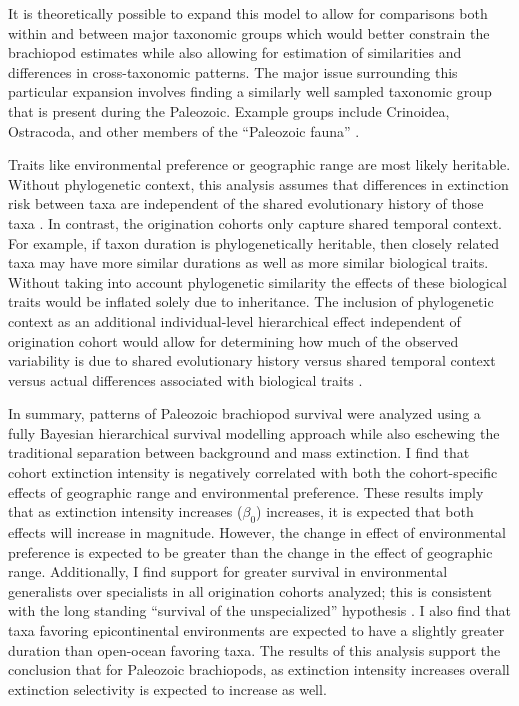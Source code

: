 \documentclass{article}
\begin{document}
It is theoretically possible to expand this model to allow for comparisons both within and between major taxonomic groups which would better constrain the brachiopod estimates while also allowing for estimation of similarities and differences in cross-taxonomic patterns. The major issue surrounding this particular expansion involves finding a similarly well sampled taxonomic group that is present during the Paleozoic. Example groups include Crinoidea, Ostracoda, and other members of the ``Paleozoic fauna'' \citep{Sepkoski1981a}.

Traits like environmental preference or geographic range \citep{Jablonski1987,Hunt2005b} are most likely heritable. Without phylogenetic context, this analysis assumes that differences in extinction risk between taxa are independent of the shared evolutionary history of those  taxa \citep{Felsenstein1985b}. In contrast, the origination cohorts only capture shared temporal context. For example, if taxon duration is phylogenetically heritable, then closely related taxa may have more similar durations as well as more similar biological traits. Without taking into account phylogenetic similarity the effects of these biological traits would be inflated solely due to inheritance. The inclusion of phylogenetic context as an additional individual-level hierarchical effect independent of origination cohort would allow for determining how much of the observed variability is due to shared evolutionary history versus shared temporal context versus actual differences associated with biological traits \citep{Harnik2014,Smits2015}. 

In summary, patterns of Paleozoic brachiopod survival were analyzed using a fully Bayesian hierarchical survival modelling approach while also eschewing the traditional separation between background and mass extinction. I find that cohort extinction intensity is negatively correlated with both the cohort-specific effects of geographic range and environmental preference. These results imply that as extinction intensity increases (\(\beta_{0}\)) increases, it is expected that both effects will increase in magnitude. However, the change in effect of environmental preference is expected to be greater than the change in the effect of geographic range. Additionally, I find support for greater survival in environmental generalists over specialists in all origination cohorts analyzed; this is consistent with the long standing ``survival of the unspecialized'' hypothesis \citep{Liow2004a,Liow2007b,Simpson1944,Simpson1953,Smits2015,Nurnberg2015,Nurnberg2013a, Baumiller1993}. I also find that taxa favoring epicontinental environments are expected to have a slightly greater duration than open-ocean favoring taxa. The results of this analysis support the conclusion that for Paleozoic brachiopods, as extinction intensity increases overall extinction selectivity is expected to increase as well.
\end{document}
